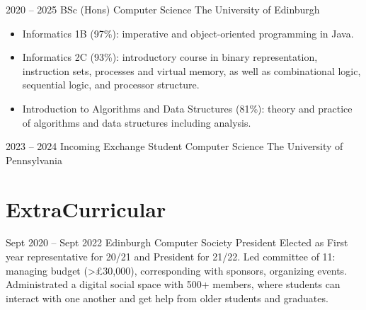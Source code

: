 \documentclass[
	9pt, %
]{FreemanCV}
\begin{document}
\begin{paracol}{2}
\qualificationentry
	{ 2020 -- 2025 } %
	{ BSc (Hons) Computer Science } %
	{} %
	{} %
	{ The University of Edinburgh } %
	{
		\begin{itemize}[noitemsep, topsep=0pt, partopsep=0pt, leftmargin=8pt, before =\leavevmode\vspace*{-\baselineskip}]
			\item Informatics 1B (97\%): imperative and object-oriented programming in Java.
			\item Informatics 2C (93\%): introductory course in binary representation, instruction sets, processes and virtual memory, as well as combinational logic, sequential logic, and processor structure.
			\item Introduction to Algorithms and Data Structures (81\%): theory and practice of algorithms and data structures including analysis. 
		\end{itemize}
	} %


\qualificationentry
	{2023 -- 2024} %
	{Incoming Exchange Student} %
	{} %
	{Computer Science} %
	{The University of Pennsylvania} %
	{}


\section{ExtraCurricular}


\extracurricularentry
	{Sept 2020 -- Sept 2022}
	{Edinburgh Computer Society}
	{President}
	{
		Elected as First year representative for 20/21 and President for 21/22. 
		Led committee of 11: managing budget (>£30,000), corresponding with sponsors, organizing events.
		Administrated a digital social space with 500+ members, where students can interact with one another and get help from older students and graduates. 
	}



\end{paracol}
\end{document}
